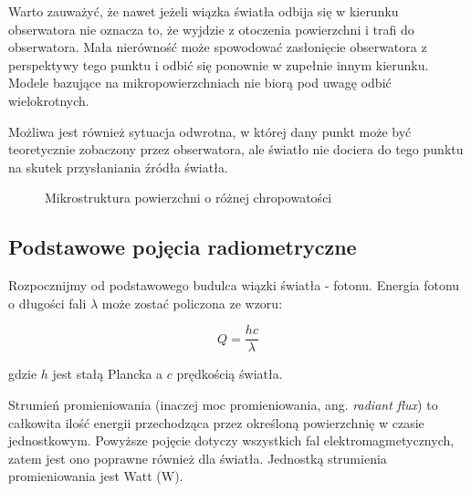 \documentclass[../main.tex]{subfiles}
\begin{document}
Warto zauważyć, że nawet jeżeli wiązka światła odbija się w kierunku
obserwatora nie oznacza to, że wyjdzie z otoczenia powierzchni i trafi do
obserwatora. Mała nierówność może spowodować zasłonięcie obserwatora z
perspektywy tego punktu i odbić się ponownie w zupełnie innym kierunku. Modele
bazujące na mikropowierzchniach nie biorą pod uwagę odbić wielokrotnych.

Możliwa jest również sytuacja odwrotna, w której dany punkt może być
teoretycznie zobaczony przez obserwatora, ale światło nie dociera do tego
punktu na skutek przysłaniania źródła światła.

\begin{figure}[h]
  \centering
  \vspace{0.25cm}
  \caption{Mikrostruktura powierzchni o różnej chropowatości}
	\label{fig:Microstructure}
\end{figure}

\subsection{Podstawowe pojęcia radiometryczne}

Rozpocznijmy od podstawowego budulca wiązki światła - fotonu. Energia fotonu
o długości fali $\lambda$ może zostać policzona ze wzoru:

$$ Q = \frac{hc}{\lambda} $$

gdzie $h$ jest stałą Plancka a $c$ prędkością światła.

Strumień promieniowania (inaczej moc promieniowania, ang. \textit{radiant
flux}) to całkowita ilość energii przechodząca przez określoną powierzchnię w
czasie jednostkowym. Powyższe pojęcie dotyczy wszystkich fal
elektromagmetycznych, zatem jest ono poprawne również dla światła. Jednostką
strumienia promieniowania jest Watt ($\text{W}$).
\end{document}
